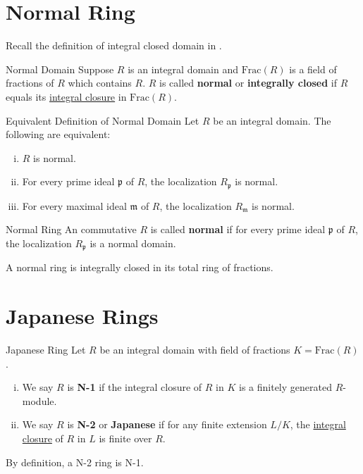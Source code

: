 \section{Normal Ring}

Recall the definition of integral closed domain in .
\begin{definition}{Normal Domain}{}
    Suppose $R$ is an integral domain and $\mathrm{Frac}(R)$ is a field of fractions of $R$ which contains $R$. $R$ is called \textbf{normal} or \textbf{integrally closed} if $R$ equals its \hyperref[th:integral_closure]{integral closure} in $\mathrm{Frac}(R)$.
\end{definition}

\begin{proposition}{Equivalent Definition of Normal Domain}{}
    Let $R$ be an integral domain. The following are equivalent:
    \begin{enumerate}[(i)]
        \item $R$ is normal.
        \item For every prime ideal $\mathfrak{p}$ of $R$, the localization $R_\mathfrak{p}$ is normal.
        \item For every maximal ideal $\mathfrak{m}$ of $R$, the localization $R_\mathfrak{m}$ is normal.
    \end{enumerate}
\end{proposition}


\begin{definition}{Normal Ring}{}
    An commutative $R$ is called \textbf{normal} if for every prime ideal $\mathfrak{p}$ of $R$, the localization $R_\mathfrak{p}$ is a normal domain.
\end{definition}
\begin{proposition}{}{}
A normal ring is integrally closed in its total ring of fractions.
\end{proposition}

\section{Japanese Rings}
\begin{definition}{Japanese Ring}{}
    Let $R$ be an integral domain with field of fractions $K=\mathrm{Frac}(R)$.
    \begin{enumerate}[(i)]
        \item We say $R$ is \textbf{N-1} if the integral closure of $R$ in $K$ is a finitely generated $R$-module.
        \item We say $R$ is \textbf{N-2} or \textbf{Japanese} if for any finite extension $L/K$, the \hyperref[th:integral_closure]{integral closure} of $R$ in $L$ is finite over $R$.
    \end{enumerate}
\end{definition}
\begin{remark}
    By definition, a N-2 ring is N-1.
\end{remark}

